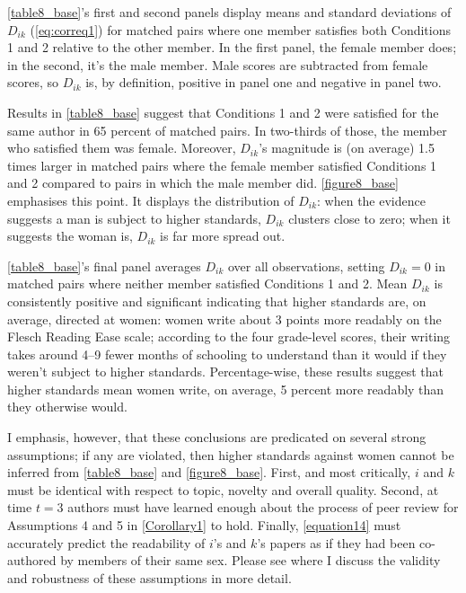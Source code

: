 

\autoref{table8_base}'s first and second panels display means and standard deviations of $D_{ik}$ (\autoref{eq:correq1}) for matched pairs where one member satisfies both Conditions 1 and 2 relative to the other member. In the first panel, the female member does; in the second, it's the male member. Male scores are subtracted from female scores, so $D_{ik}$ is, by definition, positive in panel one and negative in panel two.

Results in \autoref{table8_base} suggest that Conditions 1 and 2 were satisfied for the same author in 65 percent of matched pairs. In two-thirds of those, the member who satisfied them was female. Moreover, $D_{ik}$'s magnitude is (on average) 1.5 times larger in matched pairs where the female member satisfied Conditions 1 and 2 compared to pairs in which the male member did. \autoref{figure8_base} emphasises this point. It displays the distribution of $D_{ik}$: when the evidence suggests a man is subject to higher standards, $D_{ik}$ clusters close to zero; when it suggests the woman is, $D_{ik}$ is far more spread out.

\autoref{table8_base}'s final panel averages $D_{ik}$ over all observations, setting $D_{ik}=0$ in matched pairs where neither member satisfied Conditions 1 and 2. Mean $D_{ik}$ is consistently positive and significant indicating that higher standards are, on average, directed at women: women write about 3 points more readably on the Flesch Reading Ease scale; according to the four grade-level scores, their writing takes around 4--9 fewer months of schooling to understand than it would if they weren't subject to higher standards. Percentage-wise, these results suggest that higher standards mean women write, on average, 5 percent more readably than they otherwise would.

I emphasis, however, that these conclusions are predicated on several strong assumptions; if any are violated, then higher standards against women cannot be inferred from \autoref{table8_base} and \autoref{figure8_base}. First, and most critically, $i$ and $k$ must be identical with respect to topic, novelty and overall quality. Second, at time $t=3$ authors must have learned enough about the process of peer review for Assumptions 4 and 5 in \autoref{Corollary1} to hold. Finally, \autoref{equation14} must accurately predict the readability of $i$'s and $k$'s papers as if they had been co-authored by members of their same sex. Please see  where I discuss the validity and robustness of these assumptions in more detail.

